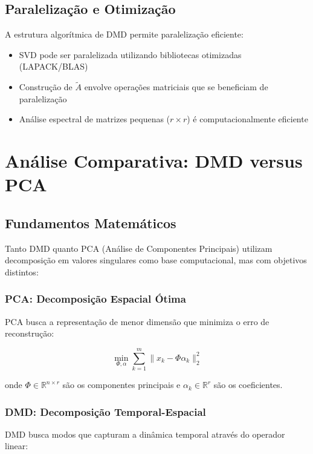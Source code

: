\documentclass[a4,11pt]{pssbmac}
\begin{document}
\subsection{Paralelização e Otimização}

A estrutura algorítmica de DMD permite paralelização eficiente:

\begin{itemize}
\item SVD pode ser paralelizada utilizando bibliotecas otimizadas (LAPACK/BLAS)
\item Construção de $\tilde{A}$ envolve operações matriciais que se beneficiam de paralelização
\item Análise espectral de matrizes pequenas ($r \times r$) é computacionalmente eficiente
\end{itemize}

\section{Análise Comparativa: DMD versus PCA}

\subsection{Fundamentos Matemáticos}

Tanto DMD quanto PCA (Análise de Componentes Principais) utilizam decomposição em valores singulares como base computacional, mas com objetivos distintos:

\subsubsection{PCA: Decomposição Espacial Ótima}
PCA busca a representação de menor dimensão que minimiza o erro de reconstrução:

\begin{equation}
\min_{\Phi, \alpha} \sum_{k=1}^{m} \|x_k - \Phi\alpha_k\|_2^2
\end{equation}

onde $\Phi \in \mathbb{R}^{n \times r}$ são os componentes principais e $\alpha_k \in \mathbb{R}^r$ são os coeficientes.

\subsubsection{DMD: Decomposição Temporal-Espacial}
DMD busca modos que capturam a dinâmica temporal através do operador linear:
\end{document}
